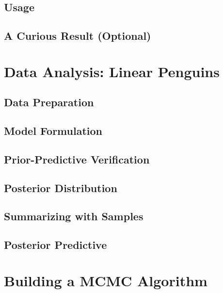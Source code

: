 \documentclass[]{article}
\begin{document}
\subsection{Usage}


\subsection{A Curious Result (Optional)}

\section{Data Analysis: Linear Penguins}

\subsection{Data Preparation}

\subsection{Model Formulation}


\subsection{Prior-Predictive Verification}


\subsection{Posterior Distribution}


\subsection{Summarizing with Samples}


\subsection{Posterior Predictive}


\section{Building a MCMC Algorithm}
\end{document}
